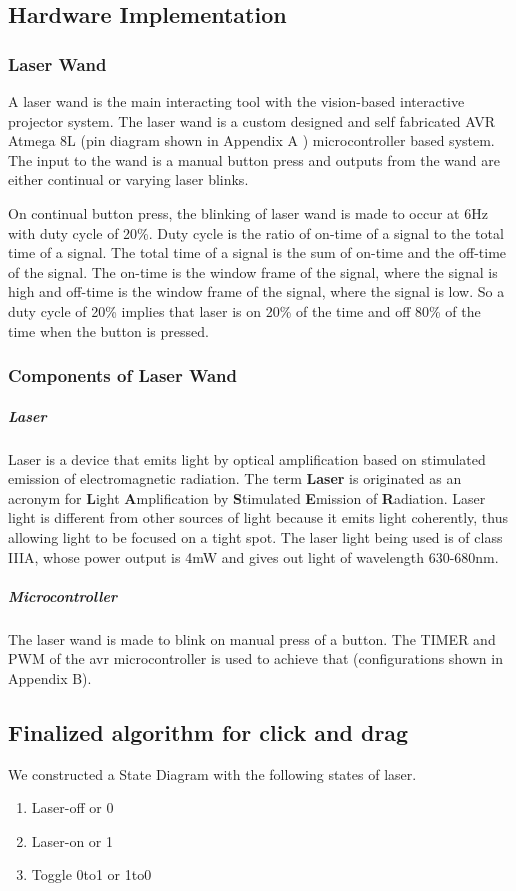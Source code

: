 \documentclass[12pt, a4paper]{article}
\begin{document}
\subsection{Hardware Implementation}
\subsubsection{Laser Wand}

A laser wand is the main interacting tool with the vision-based interactive projector system. The laser wand is a custom designed and self fabricated AVR Atmega 8L (pin diagram shown in Appendix A ) microcontroller based system. The input to the wand is a manual button press and outputs from the wand are either continual or varying laser blinks. 

On continual button press, the blinking of laser wand is made to occur at 6Hz with duty cycle of 20\%. Duty cycle is the ratio of on-time of a signal to the total time of a signal. The total time of a signal is the sum of on-time and the off-time of the signal. The on-time is the window frame of the signal, where the signal is high and off-time is the window frame of the signal, where the signal is low. So a duty cycle of 20\% implies that laser is on 20\% of the time and off 80\% of the time when the button is pressed. 

\subsubsection{Components of Laser Wand}

\subparagraph{Laser}

Laser is a device that emits light by optical amplification based on stimulated emission of electromagnetic radiation. The term \textbf{Laser} is originated as an acronym for \textbf{L}ight \textbf{A}mplification by \textbf{S}timulated \textbf{E}mission of \textbf{R}adiation. Laser light is different from other sources of light because it emits light coherently, thus allowing light to be focused on a tight spot. The laser light being used is of class IIIA, whose power output is 4mW and gives out light of wavelength 630-680nm. 

\subparagraph{Microcontroller}

The laser wand is made to blink on manual press of a button. The TIMER and PWM of the avr microcontroller is used to achieve that (configurations shown in Appendix B). 


\subsection{Finalized algorithm for click and drag}
	We constructed a State Diagram with the following states of laser.
\begin{enumerate}
\item Laser-off or 0
\item Laser-on or 1
\item Toggle 0to1 or 1to0 
\end{enumerate}
\end{document}
